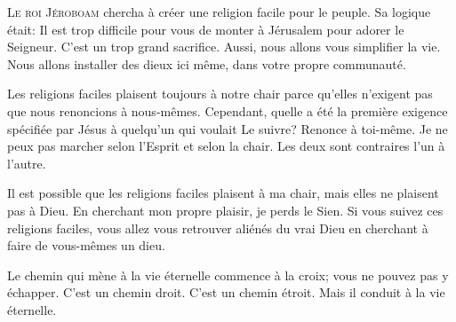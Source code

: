 

\lettrine{L}{e roi Jéroboam} chercha à créer une religion facile
 pour le peuple. Sa logique était:
 \Og Il est trop difficile pour vous de monter à Jérusalem
 pour adorer le Seigneur. C'est un trop grand sacrifice.
 Aussi, nous allons vous simplifier la vie.
 Nous allons installer des dieux ici même,
 dans votre propre communauté. \Fg{}

Les religions faciles plaisent toujours à notre chair
 parce qu'elles n'exigent pas que nous renoncions à nous-mêmes.
 Cependant, quelle a été la première exigence spécifiée par Jésus
 à quelqu'un qui voulait Le suivre?
 \Og Renonce à toi-même. \Fg{}
 Je ne peux pas marcher selon l'Esprit et selon la chair.
 Les deux sont contraires l'un à l'autre. 


Il est possible que les religions faciles plaisent à ma chair,
 mais elles ne plaisent pas à Dieu.
 En cherchant mon propre plaisir, je perds le Sien.
 Si vous suivez ces religions faciles, vous allez vous retrouver aliénés
 du vrai Dieu en cherchant à faire de vous-mêmes un dieu. 

Le chemin qui mène à la vie éternelle commence à la croix;
 vous ne pouvez pas y échapper.
 C'est un chemin droit. C'est un chemin étroit.
 Mais il conduit à la vie éternelle. 

\dvrule






